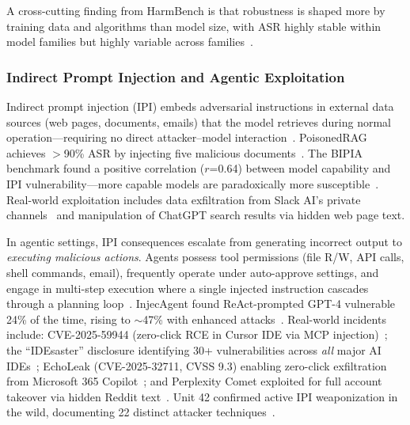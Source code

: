 A cross-cutting finding from HarmBench is that robustness is shaped more by training data and algorithms than model size, with ASR highly stable within model families but highly variable across families~\cite{mazeika2024harmbench}.


\subsubsection{Indirect Prompt Injection and Agentic Exploitation}
\label{sec:threat-ipi}

Indirect prompt injection (IPI) embeds adversarial instructions in external data sources (web pages, documents, emails) that the model retrieves during normal operation---requiring no direct attacker--model interaction~\cite{greshake2023ipi}. PoisonedRAG achieves $>$90\% ASR by injecting five malicious documents~\cite{zou2025poisonedrag}. The BIPIA benchmark found a positive correlation ($r$=0.64) between model capability and IPI vulnerability---more capable models are paradoxically more susceptible~\cite{yi2025bipia}. Real-world exploitation includes data exfiltration from Slack AI's private channels~\cite{promptarmor2024slack} and manipulation of ChatGPT search results via hidden web page text.

In agentic settings, IPI consequences escalate from generating incorrect output to \emph{executing malicious actions}. Agents possess tool permissions (file R/W, API calls, shell commands, email), frequently operate under auto-approve settings, and engage in multi-step execution where a single injected instruction cascades through a planning loop~\cite{schneider2025promptware}. InjecAgent found ReAct-prompted GPT-4 vulnerable 24\% of the time, rising to $\sim$47\% with enhanced attacks~\cite{zhan2024injecagent}. Real-world incidents include: CVE-2025-59944 (zero-click RCE in Cursor IDE via MCP injection)~\cite{lakera2025cursor}; the ``IDEsaster'' disclosure identifying 30+ vulnerabilities across \emph{all} major AI IDEs~\cite{idesaster2025}; EchoLeak (CVE-2025-32711, CVSS 9.3) enabling zero-click exfiltration from Microsoft 365 Copilot~\cite{echoleak2025}; and Perplexity Comet exploited for full account takeover via hidden Reddit text~\cite{brave2025comet}. Unit 42 confirmed active IPI weaponization in the wild, documenting 22 distinct attacker techniques~\cite{unit42ipi2026}.

